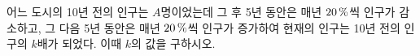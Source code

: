 어느 도시의 10년 전의 인구는 $A$명이었는데 그 후 5년 동안은 매년 $20\mkern3mu \%$씩 인구가 감소하고, 그 다음 5년 동안은 매년 $20\mkern3mu \%$씩 인구가 증가하여 현재의 인구는 10년 전의 인구의 $k$배가 되었다. 이때 $k$의 값을 구하시오. 
